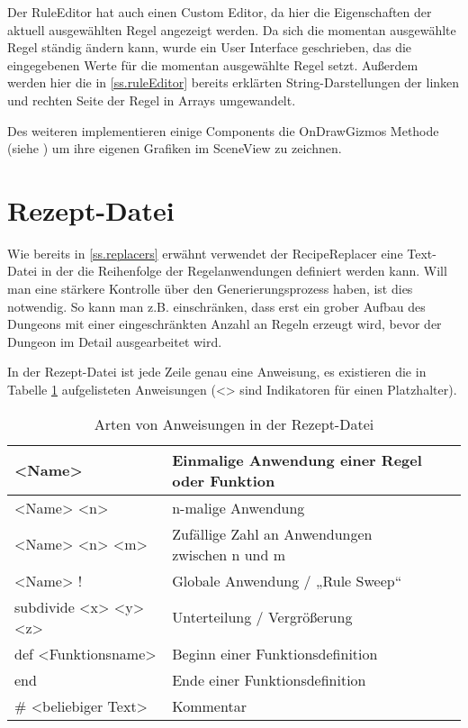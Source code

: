 Der RuleEditor hat auch einen Custom Editor, da hier die Eigenschaften der aktuell ausgewählten Regel angezeigt werden. Da sich die momentan ausgewählte Regel ständig ändern kann, wurde ein User Interface geschrieben, das die eingegebenen Werte für die momentan ausgewählte Regel setzt. Außerdem werden hier die in \ref{ss.ruleEditor} bereits erklärten String-Darstellungen der linken und rechten Seite der Regel in Arrays umgewandelt.

Des weiteren implementieren einige Components die OnDrawGizmos Methode (siehe \cite[Seite: MonoBehaviour.OnDrawGizmos]{unitySciptingReference}) um ihre eigenen Grafiken im SceneView zu zeichnen. 


\section{Rezept-Datei}\label{s.rezeptDatei}

Wie bereits in \ref{ss.replacers} erwähnt verwendet der RecipeReplacer eine Text-Datei in der die Reihenfolge der Regelanwendungen definiert werden kann. Will man eine stärkere Kontrolle über den Generierungsprozess haben, ist dies notwendig. So kann man z.B. einschränken, dass erst ein grober Aufbau des Dungeons mit einer eingeschränkten Anzahl an Regeln erzeugt wird, bevor der Dungeon im Detail ausgearbeitet wird.

In der Rezept-Datei ist jede Zeile genau eine Anweisung, es existieren die in Tabelle \ref{t.anweisungen} aufgelisteten Anweisungen (<> sind Indikatoren für einen Platzhalter).

\begin{table}[h]
    \begin{tabular}{@{}llll@{}}
        \toprule
        <Name> & Einmalige Anwendung einer Regel oder Funktion \\ \midrule
        <Name> <n> & n-malige Anwendung \\ \midrule
        <Name> <n> <m> & Zufällige Zahl an Anwendungen zwischen n und m \\ \midrule
        <Name> ! & Globale Anwendung / „Rule Sweep“ \\ \midrule
        subdivide <x> <y> <z> & Unterteilung / Vergrößerung \\ \midrule
        def <Funktionsname> & Beginn einer Funktionsdefinition \\ \midrule
        end & Ende einer Funktionsdefinition \\ \midrule
        \# <beliebiger Text> & Kommentar \\ \bottomrule
    \end{tabular}
    \caption{Arten von Anweisungen in der Rezept-Datei}
    \label{t.anweisungen}
\end{table}

